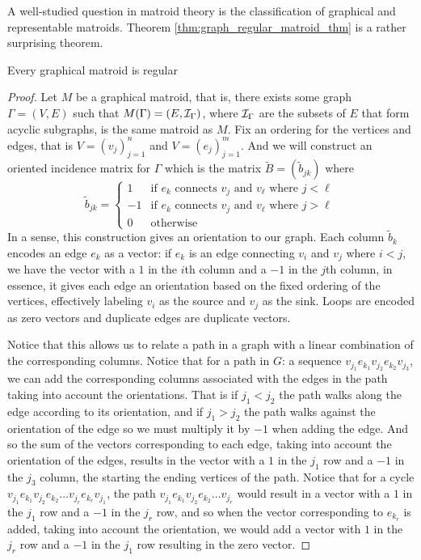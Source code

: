 A well-studied question in matroid theory is the classification of graphical and representable matroids. Theorem \ref{thm:graph_regular_matroid_thm} is a rather surprising theorem.

\begin{thm}
\label{thm:graph_regular_matroid_thm}
Every graphical matroid is regular
\end{thm}
\begin{proof}
    Let $M$ be a graphical matroid, that is, there exists some graph $\Gamma=(V, E)$ such that $M(\Gamma)=(E,\mathcal{I}_\Gamma)$, where $\mathcal{I}_\Gamma$ are the subsets of $E$ that form acyclic subgraphs, is the same matroid as $M$. Fix an ordering for the vertices and edges, that is $V=(v_j)_{j=1}^n$ and $V=(e_j)_{j=1}^m$. And we will construct an oriented incidence matrix for $\Gamma$ which is the matrix $\tilde{B}=(\tilde{b}_{jk})$ where 
    $$\tilde{b}_{jk}=\begin{cases}
        1 & \text{if } e_k \text{ connects } v_j \text{ and } v_\ell \text{ where } j<\ell\\
        -1 & \text{if } e_k \text{ connects } v_j \text{ and } v_\ell \text{ where } j>\ell\\
        0 & \text{otherwise}
    \end{cases}$$
    In a sense, this construction gives an orientation to our graph. Each column $\tilde{b}_k$ encodes an edge $e_k$ as a vector: if $e_k$ is an edge connecting $v_i$ and $v_j$ where $i<j$, we have the vector with a $1$ in the $i$th column and a $-1$ in the $j$th column, in essence, it gives each edge an orientation based on the fixed ordering of the vertices, effectively labeling $v_i$ as the source and $v_j$ as the sink. Loops are encoded as zero vectors and duplicate edges are duplicate vectors.
    
    Notice that this allows us to relate a path in a graph with a linear combination of the corresponding columns. Notice that for a path in $G$: a sequence $v_{j_1}e_{k_1}v_{j_2}e_{k_2}v_{j_3}$, we can add the corresponding columns associated with the edges in the path taking into account the orientations. That is if $j_1<j_2$ the path walks along the edge according to its orientation, and if $j_1>j_2$ the path walks against the orientation of the edge so we must multiply it by $-1$ when adding the edge. And so the sum of the vectors corresponding to each edge, taking into account the orientation of the edges, results in the vector with a $1$ in the $j_1$ row and a $-1$ in the $j_3$ column, the starting the ending vertices of the path. Notice that for a cycle $v_{j_1}e_{k_1}v_{j_2}e_{k_2}\dots v_{j_r}e_{k_r}v_{j_1}$, the path $v_{j_1}e_{k_1}v_{j_2}e_{k_2}\dots v_{j_r}$ would result in a vector with a $1$ in the $j_1$ row and a $-1$ in the $j_r$ row, and so when the vector corresponding to $e_{k_r}$ is added, taking into account the orientation, we would add a vector with $1$ in the $j_r$ row and a $-1$ in the $j_1 $ row resulting in the zero vector. 


\end{proof}
